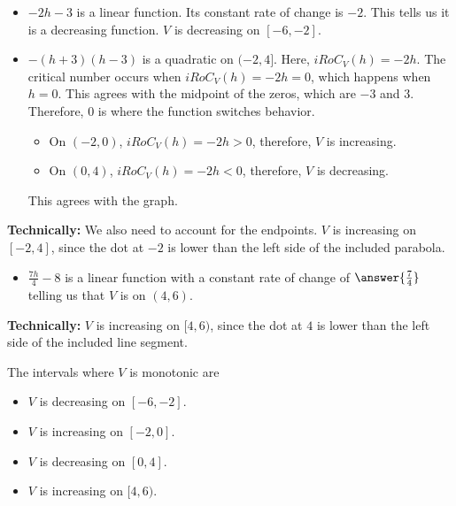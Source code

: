 \documentclass{ximera}
\begin{document}
\begin{itemize}
\item \textbf{$-2h-3$} is a linear function.  Its constant rate of change is $-2$.  This tells us it is a decreasing function.  $V$ is decreasing on $[-6, -2]$.

\item \textbf{$-(h+3)(h-3)$} is a quadratic on $(-2, 4]$. Here, $iRoC_V(h) = -2h$. The critical number occurs when $iRoC_V(h) = -2h = 0$, which happens when $h=0$. This agrees with the midpoint of the zeros, which are $-3$ and $3$.  Therefore, $0$ is where the function switches behavior.  

\begin{itemize}
\item On $(-2, 0)$, $iRoC_V(h) = -2h > 0$, therefore, $V$ is increasing.  
\item On $(0,4)$, $iRoC_V(h) = -2h < 0$, therefore, $V$ is decreasing.
\end{itemize}

This agrees with the graph.

\end{itemize}


\textbf{Technically:} We also need to account for the endpoints. $V$ is increasing on $[-2, 4]$, since the dot at $-2$ is lower than the left side of the included parabola.


\begin{question}
\begin{itemize}
\item \textbf{$\frac{7h}{4} - 8$} is a linear function with a constant rate of change of $\answer{\frac{7}{4}}$ telling us that $V$ is  on $(4, 6)$.
\end{itemize}
\end{question}

\textbf{Technically:} $V$ is increasing on $[4, 6)$, since the dot at $4$ is lower than the left side of the included line segment.


The intervals where $V$ is monotonic are

\begin{itemize}
\item $V$ is decreasing on $[-6,-2]$.
\item $V$ is increasing on $[-2,0]$.
\item $V$ is decreasing on $[0,4]$.
\item $V$ is increasing on $[4,6)$.
\end{itemize}
\end{document}
